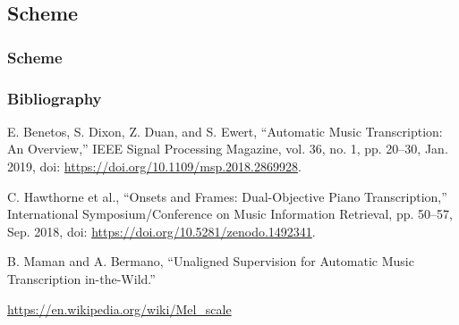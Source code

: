 \documentclass{beamer}
\newcommand{\emp}[1]{\textcolor{tum}{\textbf{#1}}}
\begin{document}
\subsection{Scheme}
\begin{frame}
	\frametitle{Scheme}



\end{frame}































\begin{frame}[shrink=5]
	\frametitle{Bibliography}



	
	\begin{thebibliography}{BenetosMusicTranscription}

		E. Benetos, S. Dixon, Z. Duan, and S. Ewert, “Automatic Music Transcription: An Overview,” IEEE Signal Processing Magazine, vol. 36, no. 1, pp. 20–30, Jan. 2019, doi: \url{https://doi.org/10.1109/msp.2018.2869928}.

		C. Hawthorne et al., “Onsets and Frames: Dual-Objective Piano Transcription,” International Symposium/Conference on Music Information Retrieval, pp. 50–57, Sep. 2018, doi: \url{https://doi.org/10.5281/zenodo.1492341}.

		B. Maman and A. Bermano, “Unaligned Supervision for Automatic Music Transcription in-the-Wild.”

		\url{https://en.wikipedia.org/wiki/Mel_scale}

	\end{thebibliography}
\end{frame}
\end{document}
